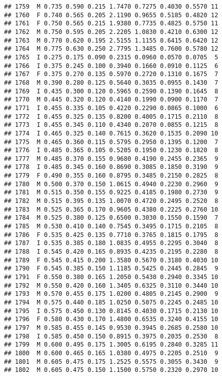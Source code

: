 \documentclass[
]{article}
\begin{document}
\begin{verbatim}
## 1759  M 0.735 0.590 0.215 1.7470 0.7275 0.4030 0.5570 11
## 1760  F 0.740 0.565 0.205 2.1190 0.9655 0.5185 0.4820 12
## 1761  F 0.750 0.565 0.215 1.9380 0.7735 0.4825 0.5750 11
## 1762  M 0.750 0.595 0.205 2.2205 1.0830 0.4210 0.6300 12
## 1763  M 0.770 0.620 0.195 2.5155 1.1155 0.6415 0.6420 12
## 1764  M 0.775 0.630 0.250 2.7795 1.3485 0.7600 0.5780 12
## 1765  I 0.275 0.175 0.090 0.2315 0.0960 0.0570 0.0705  5
## 1766  I 0.375 0.245 0.100 0.3940 0.1660 0.0910 0.1125  6
## 1767  F 0.375 0.270 0.135 0.5970 0.2720 0.1310 0.1675  7
## 1768  M 0.390 0.280 0.125 0.5640 0.3035 0.0955 0.1430  7
## 1769  I 0.435 0.300 0.120 0.5965 0.2590 0.1390 0.1645  8
## 1770  M 0.445 0.320 0.120 0.4140 0.1990 0.0900 0.1170  7
## 1771  I 0.455 0.335 0.105 0.4220 0.2290 0.0865 0.1000  6
## 1772  I 0.455 0.325 0.135 0.8200 0.4005 0.1715 0.2110  8
## 1773  I 0.455 0.345 0.110 0.4340 0.2070 0.0855 0.1215  8
## 1774  I 0.465 0.325 0.140 0.7615 0.3620 0.1535 0.2090 10
## 1775  M 0.465 0.360 0.115 0.5795 0.2950 0.1395 0.1200  7
## 1776  I 0.485 0.365 0.105 0.5205 0.1950 0.1230 0.1820  8
## 1777  M 0.485 0.370 0.155 0.9680 0.4190 0.2455 0.2365  9
## 1778  I 0.485 0.345 0.160 0.8690 0.3085 0.1850 0.3190  9
## 1779  F 0.490 0.355 0.160 0.8795 0.3485 0.2150 0.2825  8
## 1780  M 0.500 0.370 0.150 1.0615 0.4940 0.2230 0.2960  9
## 1781  M 0.515 0.350 0.155 0.9225 0.4185 0.1980 0.2730  9
## 1782  M 0.515 0.395 0.135 1.0070 0.4720 0.2495 0.2520  8
## 1783  M 0.525 0.365 0.170 0.9605 0.4380 0.2225 0.2760 10
## 1784  M 0.525 0.380 0.125 0.6500 0.3030 0.1550 0.1590  7
## 1785  M 0.530 0.410 0.140 0.7545 0.3495 0.1715 0.2105  8
## 1786  F 0.535 0.425 0.135 0.7710 0.3765 0.1815 0.1795  8
## 1787  I 0.535 0.385 0.180 1.0835 0.4955 0.2295 0.3040  8
## 1788  I 0.545 0.420 0.165 0.8935 0.4235 0.2195 0.2280  8
## 1789  F 0.545 0.415 0.200 1.3580 0.5670 0.3180 0.4030 10
## 1790  F 0.545 0.385 0.150 1.1185 0.5425 0.2445 0.2845  9
## 1791  F 0.550 0.380 0.165 1.2050 0.5430 0.2940 0.3345 10
## 1792  M 0.550 0.420 0.160 1.3405 0.6325 0.3110 0.3440 10
## 1793  M 0.570 0.455 0.175 1.0200 0.4805 0.2145 0.2900  9
## 1794  M 0.575 0.440 0.185 1.0250 0.5075 0.2245 0.2485 10
## 1795  I 0.575 0.450 0.130 0.8145 0.4030 0.1715 0.2130 10
## 1796  F 0.580 0.430 0.170 1.4800 0.6535 0.3240 0.4155 10
## 1797  M 0.585 0.455 0.145 0.9530 0.3945 0.2685 0.2580 10
## 1798  I 0.585 0.450 0.150 0.8915 0.3975 0.2035 0.2530  8
## 1799  M 0.600 0.495 0.175 1.3005 0.6195 0.2840 0.3285 11
## 1800  M 0.600 0.465 0.165 1.0380 0.4975 0.2205 0.2510  9
## 1801  M 0.605 0.475 0.175 1.2525 0.5575 0.3055 0.3430  9
## 1802  M 0.605 0.475 0.150 1.1500 0.5750 0.2320 0.2970 10

\end{verbatim}
\end{document}
